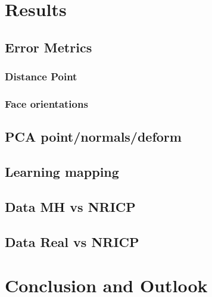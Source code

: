 \chapter{Results}

\section{Error Metrics}

\subsection{Distance Point}
\subsection{Face orientations}

\section{PCA point/normals/deform}

\section{Learning mapping}

\section{Data MH vs NRICP}

\section{Data Real vs NRICP}

\chapter{Conclusion and Outlook}
